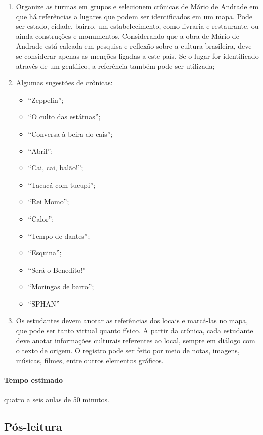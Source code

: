 \documentclass[12pt]{extarticle}
\begin{document}
\begin{enumerate}
\item
Organize as turmas em grupos e selecionem
crônicas de Mário de Andrade em que há referências a lugares que podem
ser identificados em um mapa. Pode ser estado, cidade, bairro, um
estabelecimento, como livraria e restaurante, ou ainda construções e
monumentos. Considerando que a obra de Mário de Andrade está calcada em
pesquisa e reflexão sobre a cultura brasileira, deve-se considerar
apenas as menções ligadas a este país. Se o lugar for identificado
através de um gentílico, a referência também pode ser utilizada;

\item
Algumas sugestões de crônicas:

\begin{itemize}
\item
  ``Zeppelin'';
\item
  ``O culto das estátuas'';
\item
  ``Conversa à beira do cais'';
\item
  ``Abril'';
\item
  ``Cai, cai, balão!'';
\item
  ``Tacacá com tucupi'';
\item
  ``Rei Momo'';
\item
  ``Calor'';
\item
  ``Tempo de dantes'';
\item
  ``Esquina'';
\item
  ``Será o Benedito!''
\item
  ``Moringas de barro'';
\item
  ``SPHAN''
\end{itemize}

\item
Os estudantes devem anotar as referências dos locais e marcá-las no
mapa, que pode ser tanto virtual quanto físico. A partir da crônica, cada
estudante deve anotar informações culturais referentes ao local, sempre
em diálogo com o texto de origem. O registro pode ser feito por meio de
notas, imagens, músicas, filmes, entre outros elementos gráficos.
\end{enumerate}

\paragraph{Tempo estimado} quatro a seis aulas de 50 minutos.

\subsection{Pós-leitura}
\end{document}
